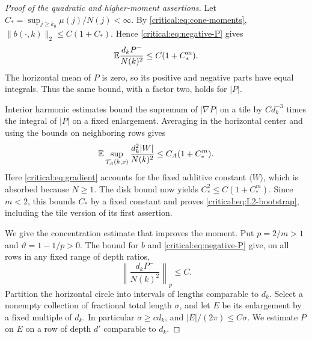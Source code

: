 \begin{proof}[Proof of the quadratic and higher-moment assertions]
Let \(C_* =\sup_{j\ge k_0}\mu(j)/N(j)<\infty\).
By \eqref{critical:eq:cone-moments},
\(\|b(\cdot,k)\|_2\le C(1+C_*)\). Hence
\eqref{critical:eq:negative-P} gives
\[
 \mathbb E\frac{d_kP^-}{N(k)^2}\le C(1+C_*^m).
\]
The horizontal mean of \(P\) is zero, so its positive and negative
parts have equal integrals. Thus the same bound, with a factor two,
holds for \(|P|\).

Interior harmonic estimates bound the supremum of \(|\nabla P|\)
on a tile by \(C d_k^{-3}\) times the integral of \(|P|\) on a fixed
enlargement. Averaging in the horizontal center and using the bounds
on neighboring rows gives
\[
 \mathbb E\sup_{\mathcal T_A(k,x)}
       \frac{d_k^2|W|}{N(k)^2}
 \le C_A(1+C_*^m).
\]
Here \eqref{critical:eq:gradient} accounts for the fixed additive
constant \(\langle W\rangle\), which is absorbed because \(N\ge1\).
The disk bound now yields
\(C_*^2\le C(1+C_*^m)\). Since \(m<2\), this bounds \(C_*\)
by a fixed constant and proves \eqref{critical:eq:L2-bootstrap},
including the tile version of its first assertion.

We give the concentration estimate that improves the moment. Put
\(p=2/m>1\) and \(\vartheta=1-1/p>0\). The bound for \(b\) and
\eqref{critical:eq:negative-P} give, on all rows in any fixed range of
depth ratios,
\begin{equation}\label{critical:eq:negative-Lp}
 \left\|\frac{d_kP^-}{N(k)^2}\right\|_p\le C.
\end{equation}
Partition the horizontal circle into intervals of lengths comparable
to \(d_k\). Select a nonempty collection of fractional total length
\(\sigma\), and let \(E\) be its enlargement by a fixed multiple of
\(d_k\). In particular \(\sigma\ge c d_k\), and
\(|E|/(2\pi)\le C\sigma\). We estimate \(P\) on \(E\) on a row
of depth \(d'\) comparable to \(d_k\).


\end{proof}
